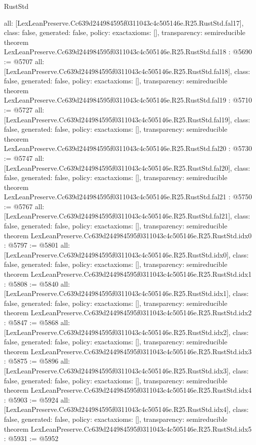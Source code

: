 \begin{lexlean}{RustStd}
\begin{coremodule}
{  all: [LexLeanPreserve.Cc639d244984595f0311043c4c505146e.R25.RustStd.fal17],
  class: false,
  generated: false,
  policy: exact{axioms: []},
  transparency: semireducible
}
theorem LexLeanPreserve.Cc639d244984595f0311043c4c505146e.R25.RustStd.fal18 : @5690 := @5707 {
  all: [LexLeanPreserve.Cc639d244984595f0311043c4c505146e.R25.RustStd.fal18],
  class: false,
  generated: false,
  policy: exact{axioms: []},
  transparency: semireducible
}
theorem LexLeanPreserve.Cc639d244984595f0311043c4c505146e.R25.RustStd.fal19 : @5710 := @5727 {
  all: [LexLeanPreserve.Cc639d244984595f0311043c4c505146e.R25.RustStd.fal19],
  class: false,
  generated: false,
  policy: exact{axioms: []},
  transparency: semireducible
}
theorem LexLeanPreserve.Cc639d244984595f0311043c4c505146e.R25.RustStd.fal20 : @5730 := @5747 {
  all: [LexLeanPreserve.Cc639d244984595f0311043c4c505146e.R25.RustStd.fal20],
  class: false,
  generated: false,
  policy: exact{axioms: []},
  transparency: semireducible
}
theorem LexLeanPreserve.Cc639d244984595f0311043c4c505146e.R25.RustStd.fal21 : @5750 := @5767 {
  all: [LexLeanPreserve.Cc639d244984595f0311043c4c505146e.R25.RustStd.fal21],
  class: false,
  generated: false,
  policy: exact{axioms: []},
  transparency: semireducible
}
theorem LexLeanPreserve.Cc639d244984595f0311043c4c505146e.R25.RustStd.idx0 : @5797 := @5801 {
  all: [LexLeanPreserve.Cc639d244984595f0311043c4c505146e.R25.RustStd.idx0],
  class: false,
  generated: false,
  policy: exact{axioms: []},
  transparency: semireducible
}
theorem LexLeanPreserve.Cc639d244984595f0311043c4c505146e.R25.RustStd.idx1 : @5808 := @5840 {
  all: [LexLeanPreserve.Cc639d244984595f0311043c4c505146e.R25.RustStd.idx1],
  class: false,
  generated: false,
  policy: exact{axioms: []},
  transparency: semireducible
}
theorem LexLeanPreserve.Cc639d244984595f0311043c4c505146e.R25.RustStd.idx2 : @5847 := @5868 {
  all: [LexLeanPreserve.Cc639d244984595f0311043c4c505146e.R25.RustStd.idx2],
  class: false,
  generated: false,
  policy: exact{axioms: []},
  transparency: semireducible
}
theorem LexLeanPreserve.Cc639d244984595f0311043c4c505146e.R25.RustStd.idx3 : @5875 := @5896 {
  all: [LexLeanPreserve.Cc639d244984595f0311043c4c505146e.R25.RustStd.idx3],
  class: false,
  generated: false,
  policy: exact{axioms: []},
  transparency: semireducible
}
theorem LexLeanPreserve.Cc639d244984595f0311043c4c505146e.R25.RustStd.idx4 : @5903 := @5924 {
  all: [LexLeanPreserve.Cc639d244984595f0311043c4c505146e.R25.RustStd.idx4],
  class: false,
  generated: false,
  policy: exact{axioms: []},
  transparency: semireducible
}
theorem LexLeanPreserve.Cc639d244984595f0311043c4c505146e.R25.RustStd.idx5 : @5931 := @5952 {
}
\end{coremodule}
\end{lexlean}
